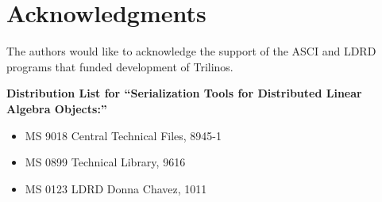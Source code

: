\documentclass[11pt,relax]{SANDreport}
\begin{document}
\section*{Acknowledgments}

The authors would like to acknowledge the support of the ASCI and LDRD programs
that funded development of Trilinos.

\medskip




\newpage

\noindent
{\bf
Distribution List for ``Serialization Tools for Distributed Linear Algebra Objects:''
}

\begin{itemize}
\item MS 9018 Central Technical Files, 8945-1
\item MS 0899 Technical Library, 9616
\item MS 0123 LDRD Donna Chavez, 1011
\end{itemize}
\end{document}
